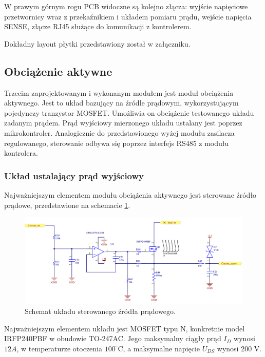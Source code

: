 W prawym górnym rogu PCB widoczne są kolejno złącza: wyjście napięciowe przetwornicy wraz z przekaźnikiem i układem 
pomiaru prądu, wejście napięcia SENSE, złącze RJ45 służące do komunikacji z kontrolerem.

Dokładny layout płytki przedstawiony został w załączniku.



\subsection{Obciążenie aktywne}

Trzecim zaprojektowanym i wykonanym modułem jest moduł obciążenia aktywnego. Jest to układ
bazujący na źródle prądowym, wykorzystującym pojedynczy tranzystor MOSFET. Umożliwia on obciążenie 
testowanego układu zadanym prądem. Prąd wyjściowy mierzonego układu ustalany jest poprzez mikrokontroler.
Analogicznie do przedstawionego wyżej modułu zasilacza regulowanego, sterowanie odbywa się poprzez interfejs RS485 
z modułu kontrolera.

\subsubsection{Układ ustalający prąd wyjściowy}

Najważniejszym elementem modułu obciążenia aktywnego jest sterowane źródło prądowe, przedstawione na schemacie \ref{fig:dcLoad}.

\begin{figure}[h!]
    \begin{center}
        \includegraphics[width = 17cm]{images/dc_load_mosfet_2.png}
        \caption{Schemat układu sterowanego źródła prądowego.} 
        \label{fig:dcLoad}
    \end{center}
\end{figure}

Najważniejszym elementem układu jest MOSFET typu N, konkretnie model IRFP240PBF \cite{IRFP240} w obudowie TO-247AC.
Jego maksymalny ciągły prąd $I_{D}$ wynosi $12 A$, w temperaturze otoczenia $100^{\circ}$C, a maksymalne napięcie $U_{DS}$ wynosi 200 V.

